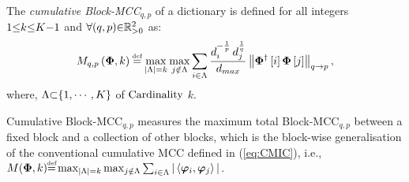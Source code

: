 \begin{Mydefinition}
\label{def:CBMIC}
\leftbar
The \emph{cumulative Block-MCC$_{q,p}$} of a dictionary  is defined for all integers $1 {\leq} k {\leq} K {-} 1$ and $\forall (q , p) {\in} \mathbb{R}^2_{{>} 0}$ as:
\begin{equation*}
M_{q,p}\myparanthese{\myPhi , k} \myeq
\max_{\myabs{\Lambda}=k} \max_{j \notin \Lambda} \sum_{i \in \Lambda}
\frac{d_{i}^{-\frac1p} \, d_{j}^{\frac1q}}{d_{max}} \mynorm{\myPhi^\dagger\mybracket{i} \myPhi \mybracket{j}}_{q \to p},
\end{equation*}
where, $\Lambda {\subset} \{1, \cdots, K\}$ of $\mathrm{Cardinality}$ $k$.
\endleftbar
\end{Mydefinition}

Cumulative Block-MCC$_{q,p}$ measures the maximum total Block-MCC$_{q,p}$ between a fixed block and a collection of other blocks, which is the block-wise generalisation of the conventional cumulative MCC defined in (\ref{eq:CMIC}), i.e., $M(\myPhi , k) {\myeq} \max_{\myabs{\Lambda}=k} \max_{j \notin \Lambda} \sum_{i \in \Lambda} | \left\langle \boldsymbol{\varphi}_i , \boldsymbol{\varphi}_{j} \right\rangle|$.